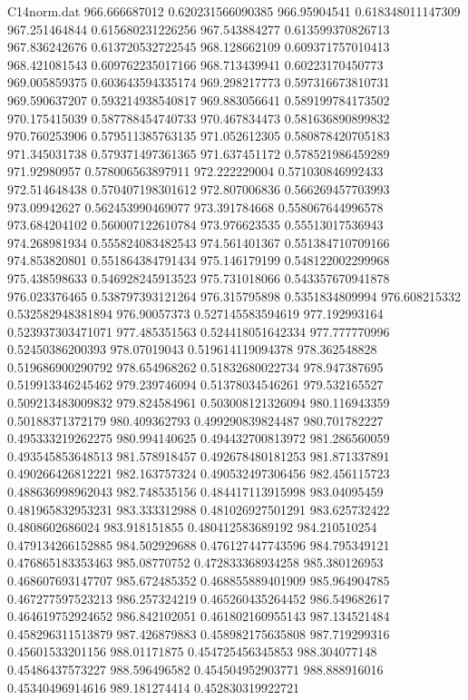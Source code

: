 \begin{filecontents}{C14norm.dat}
966.666687012			0.620231566090385
966.95904541			0.618348011147309
967.251464844			0.615680231226256
967.543884277			0.613599370826713
967.836242676			0.613720532722545
968.128662109			0.609371757010413
968.421081543			0.609762235017166
968.713439941			0.60223170450773
969.005859375			0.603643594335174
969.298217773			0.597316673810731
969.590637207			0.593214938540817
969.883056641			0.589199784173502
970.175415039			0.587788454740733
970.467834473			0.581636890899832
970.760253906			0.579511385763135
971.052612305			0.580878420705183
971.345031738			0.579371497361365
971.637451172			0.578521986459289
971.92980957			0.578006563897911
972.222229004			0.571030846992433
972.514648438			0.570407198301612
972.807006836			0.566269457703993
973.09942627			0.562453990469077
973.391784668			0.558067644996578
973.684204102			0.560007122610784
973.976623535			0.55513017536943
974.268981934			0.555824083482543
974.561401367			0.551384710709166
974.853820801			0.551864384791434
975.146179199			0.548122002299968
975.438598633			0.546928245913523
975.731018066			0.543357670941878
976.023376465			0.538797393121264
976.315795898			0.5351834809994
976.608215332			0.532582948381894
976.90057373			0.527145583594619
977.192993164			0.523937303471071
977.485351563			0.524418051642334
977.777770996			0.52450386200393
978.07019043			0.519614119094378
978.362548828			0.519686900290792
978.654968262			0.51832680022734
978.947387695			0.519913346245462
979.239746094			0.51378034546261
979.532165527			0.509213483009832
979.824584961			0.503008121326094
980.116943359			0.50188371372179
980.409362793			0.499290839824487
980.701782227			0.495333219262275
980.994140625			0.494432700813972
981.286560059			0.493545853648513
981.578918457			0.492678480181253
981.871337891			0.490266426812221
982.163757324			0.490532497306456
982.456115723			0.488636998962043
982.748535156			0.484417113915998
983.04095459			0.481965832953231
983.333312988			0.481026927501291
983.625732422			0.4808602686024
983.918151855			0.480412583689192
984.210510254			0.479134266152885
984.502929688			0.476127447743596
984.795349121			0.476865183353463
985.08770752			0.472833368934258
985.380126953			0.468607693147707
985.672485352			0.468855889401909
985.964904785			0.467277597523213
986.257324219			0.465260435264452
986.549682617			0.464619752924652
986.842102051			0.461802160955143
987.134521484			0.458296311513879
987.426879883			0.458982175635808
987.719299316			0.45601533201156
988.01171875			0.454725456345853
988.304077148			0.45486437573227
988.596496582			0.454504952903771
988.888916016			0.45340496914616
989.181274414			0.452830319922721

\end{filecontents}
